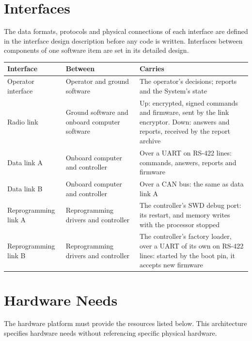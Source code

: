 \documentclass[11pt,a4paper]{article}
\begin{document}
\section{Interfaces}
The data formats, protocols and physical connections of each interface are
defined in the interface design description before any code is written.
Interfaces between components of one software item are set in its detailed
design.

\smallskip
{\small\noindent\begin{tabularx}{\textwidth}{@{}l>{\raggedright\arraybackslash}p{4.6cm}>{\raggedright\arraybackslash}X@{}}
\toprule
Interface & Between & Carries \\
\midrule
Operator interface & Operator and ground software & The operator's decisions; reports and the System's state \\
Radio link & Ground software and onboard computer software & Up: encrypted, signed commands and firmware, sent by the link encryptor. Down: answers and reports, received by the report archive \\
Data link A & Onboard computer and controller & Over a UART on RS-422 lines: commands, answers, reports and firmware \\
Data link B & Onboard computer and controller & Over a CAN bus: the same as data link A \\
Reprogramming link A & Reprogramming drivers and controller & The controller's SWD debug port: its restart, and memory writes with the processor stopped \\
Reprogramming link B & Reprogramming drivers and controller & The controller's factory loader, over a UART of its own on RS-422 lines: started by the boot pin, it accepts new firmware \\
\bottomrule
\end{tabularx}}

\section{Hardware Needs}
\label{sec:hardware}
The hardware platform must provide the resources listed below. This
architecture specifies hardware needs without referencing specific physical
hardware.
\end{document}
